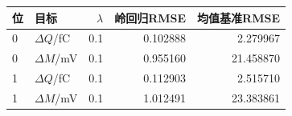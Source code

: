 \begin{tabular}{llrrr}
\toprule
位 & 目标 & $\lambda$ & 岭回归RMSE & 均值基准RMSE\\
\midrule
0 & $\Delta Q$/fC & 0.1 & 0.102888 & 2.279967\\
0 & $\Delta M$/mV & 0.1 & 0.955160 & 21.458870\\
1 & $\Delta Q$/fC & 0.1 & 0.112903 & 2.515710\\
1 & $\Delta M$/mV & 0.1 & 1.012491 & 23.383861\\
\bottomrule
\end{tabular}
